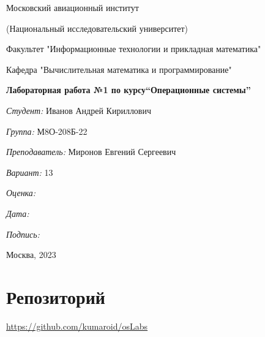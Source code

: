 \documentclass[a4paper, 12pt]{article}
\begin{document}
\thispagestyle{empty}	
\begin{center}
	Московский авиационный институт
	
	(Национальный исследовательский университет)
	
	Факультет "Информационные технологии и прикладная математика"
	
	Кафедра "Вычислительная математика и программирование"
	
\end{center}
\vspace{40ex}
\begin{center}
	\textbf{\large{Лабораторная работа №1 по курсу\linebreak \textquotedblleft Операционные системы\textquotedblright}}
\end{center}
\vspace{35ex}
\begin{flushright}
	\textit{Студент: } Иванов Андрей Кириллович
	
	\vspace{2ex}
	\textit{Группа: } М8О-208Б-22
	
	\vspace{2ex}
	\textit{Преподаватель: } Миронов Евгений Сергеевич
	
	\vspace{2ex}
	\textit{Вариант: } 13
	
	\vspace{2ex}
	\textit{Оценка: } \underline{\quad\quad\quad\quad\quad\quad}
	
	 \vspace{2ex}
	\textit{Дата: } \underline{\quad\quad\quad\quad\quad\quad}
	
	\vspace{2ex}
	\textit{Подпись: } \underline{\quad\quad\quad\quad\quad\quad}
	
\end{flushright}

\vspace{5ex}

\begin{vfill}
	\begin{center}
		Москва, 2023
	\end{center}	
\end{vfill}
\newpage


\begingroup
\color{black}
\tableofcontents\newpage
\endgroup

\section{Репозиторий}
\href{https://github.com/kumaroid/osLabs}{https://github.com/kumaroid/osLabs}
\end{document}
